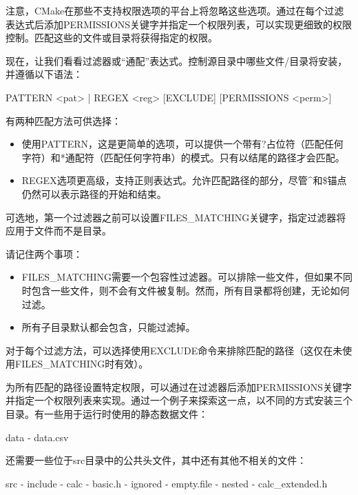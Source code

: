注意，CMake在那些不支持权限选项的平台上将忽略这些选项。通过在每个过滤表达式后添加PERMISSIONS关键字并指定一个权限列表，可以实现更细致的权限控制。匹配这些的文件或目录将获得指定的权限。

现在，让我们看看过滤器或“通配”表达式。控制源目录中哪些文件/目录将安装，并遵循以下语法：

\begin{shell}
PATTERN <pat> | REGEX <reg> [EXCLUDE] [PERMISSIONS <perm>]
\end{shell}

有两种匹配方法可供选择：

\begin{itemize}
\item
使用PATTERN，这是更简单的选项，可以提供一个带有?占位符（匹配任何字符）和*通配符（匹配任何字符串）的模式。只有以结尾的路径才会匹配。

\item
REGEX选项更高级，支持正则表达式。允许匹配路径的部分，尽管\^{}和\$锚点仍然可以表示路径的开始和结束。
\end{itemize}

可选地，第一个过滤器之前可以设置FILES\_MATCHING关键字，指定过滤器将应用于文件而不是目录。

请记住两个事项：

\begin{itemize}
\item
FILES\_MATCHING需要一个包容性过滤器。可以排除一些文件，但如果不同时包含一些文件，则不会有文件被复制。然而，所有目录都将创建，无论如何过滤。

\item
所有子目录默认都会包含，只能过滤掉。
\end{itemize}

对于每个过滤方法，可以选择使用EXCLUDE命令来排除匹配的路径（这仅在未使用FILES\_MATCHING时有效）。

为所有匹配的路径设置特定权限，可以通过在过滤器后添加PERMISSIONS关键字并指定一个权限列表来实现。通过一个例子来探索这一点，以不同的方式安装三个目录。有一些用于运行时使用的静态数据文件：

\begin{shell}
data
- data.csv
\end{shell}

还需要一些位于src目录中的公共头文件，其中还有其他不相关的文件：

\begin{shell}
src
- include
  - calc
    - basic.h
    - ignored
      - empty.file
    - nested
      - calc_extended.h
\end{shell}

